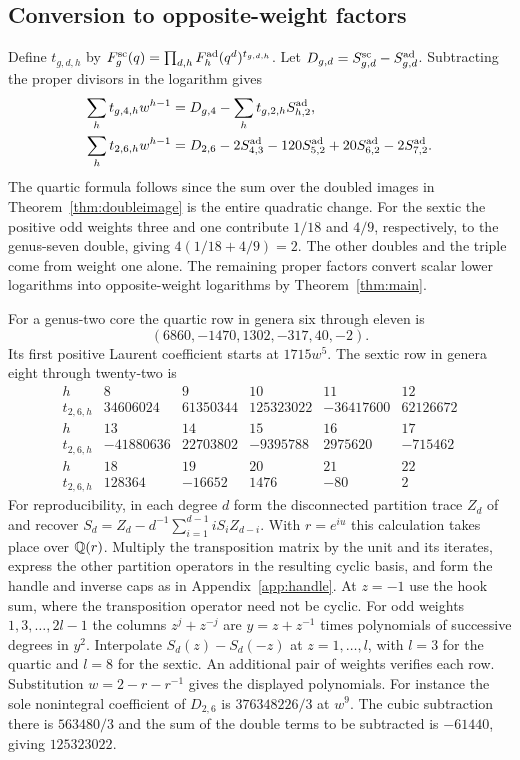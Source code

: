 \subsection{Conversion to opposite-weight factors}\label{sec:rows}
Define $t_{g,d,h}$ by
$F_g^{\rm sc}(q)=\prod_{d,h}F_h^{\rm ad}(q^d)^{t_{g,d,h}}$.
Let $D_{g,d}=S_{g,d}^{\rm sc}-S_{g,d}^{\rm ad}$. Subtracting the
proper divisors in the logarithm gives
\begin{align*}
 \sum_h t_{g,4,h}w^{h-1}
   &=D_{g,4}-\sum_h t_{g,2,h}S_{h,2}^{\rm ad},\\
 \sum_h t_{2,6,h}w^{h-1}
   &=D_{2,6}-2S_{4,3}^{\rm ad}
              -120S_{5,2}^{\rm ad}+20S_{6,2}^{\rm ad}-2S_{7,2}^{\rm ad}.
\end{align*}
The quartic formula follows since the sum over the doubled images
in Theorem~\ref{thm:doubleimage} is the entire quadratic change.
For the sextic the positive odd weights three and one contribute
$1/18$ and $4/9$, respectively, to the genus-seven double, giving
$4(1/18+4/9)=2$. The other doubles and the triple come from weight
one alone. The remaining proper factors convert scalar lower
logarithms into opposite-weight logarithms by Theorem~\ref{thm:main}.

For a genus-two core the quartic row in genera six through eleven is
\[
     (6860,-1470,1302,-317,40,-2).
\]
Its first positive Laurent coefficient starts at $1715w^5$.
The sextic row in genera eight through twenty-two is
\[
\begin{array}{c|rrrrr}
 h&8&9&10&11&12\\ \hline
 t_{2,6,h}&34606024&61350344&125323022&-36417600&62126672\\[2pt]
 h&13&14&15&16&17\\ \hline
 t_{2,6,h}&-41880636&22703802&-9395788&2975620&-715462\\[2pt]
 h&18&19&20&21&22\\ \hline
 t_{2,6,h}&128364&-16652&1476&-80&2
\end{array}
\]
For reproducibility, in each degree $d$ form the disconnected
partition trace $Z_d$ of \cite[Sections~4--8]{BP} and recover
$S_d=Z_d-d^{-1}\sum_{i=1}^{d-1}iS_iZ_{d-i}$. With $r=e^{iu}$ this
calculation takes place over $\mathbb Q(r)$. Multiply the transposition
matrix by the unit and its iterates, express the other partition
operators in the resulting cyclic basis, and form the handle and
inverse caps as in Appendix~\ref{app:handle}. At $z=-1$ use
the hook sum, where the transposition operator need not be cyclic.
For odd weights $1,3,\ldots,2l-1$ the columns
$z^j+z^{-j}$ are $y=z+z^{-1}$ times polynomials of successive
degrees in $y^2$. Interpolate $S_d(z)-S_d(-z)$ at $z=1,\ldots,l$,
with $l=3$ for the quartic and $l=8$ for the sextic. An additional
pair of weights verifies each row. Substitution $w=2-r-r^{-1}$
gives the displayed polynomials. For instance the sole nonintegral
coefficient of $D_{2,6}$ is $376348226/3$ at $w^9$. The cubic
subtraction there is $563480/3$ and the sum of the double terms
to be subtracted is $-61440$, giving $125323022$.

